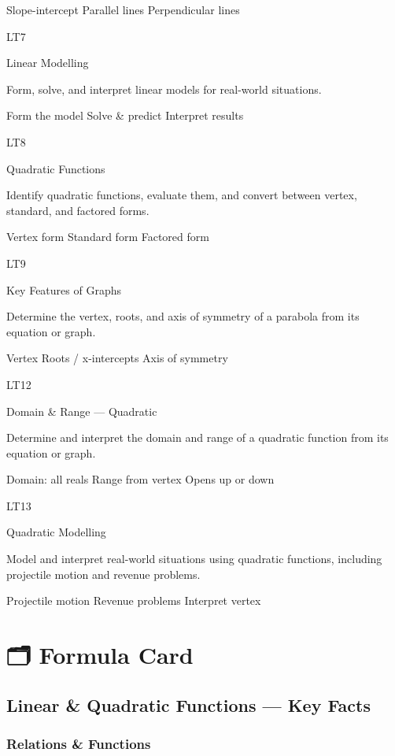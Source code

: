 \documentclass[
  letterpaper,
  DIV=11,
  numbers=noendperiod]{scrreprt}
\theoremstyle{definition}
\theoremstyle{remark}
\begin{document}
{Slope-intercept} {Parallel lines} {Perpendicular lines}

LT7

Linear Modelling

Form, solve, and interpret linear models for real-world situations.

{Form the model} {Solve \& predict} {Interpret results}

LT8

Quadratic Functions

Identify quadratic functions, evaluate them, and convert between vertex,
standard, and factored forms.

{Vertex form} {Standard form} {Factored form}

LT9

Key Features of Graphs

Determine the vertex, roots, and axis of symmetry of a parabola from its
equation or graph.

{Vertex} {Roots / x-intercepts} {Axis of symmetry}

LT12

Domain \& Range --- Quadratic

Determine and interpret the domain and range of a quadratic function
from its equation or graph.

{Domain: all reals} {Range from vertex} {Opens up or down}

LT13

Quadratic Modelling

Model and interpret real-world situations using quadratic functions,
including projectile motion and revenue problems.

{Projectile motion} {Revenue problems} {Interpret vertex}

\section{🗂️ Formula Card}\label{formula-card-3}

\subsection*{Linear \& Quadratic Functions --- Key
Facts}\label{linear-quadratic-functions-key-facts}

\subsubsection*{Relations \& Functions}\label{relations-functions}
\end{document}

